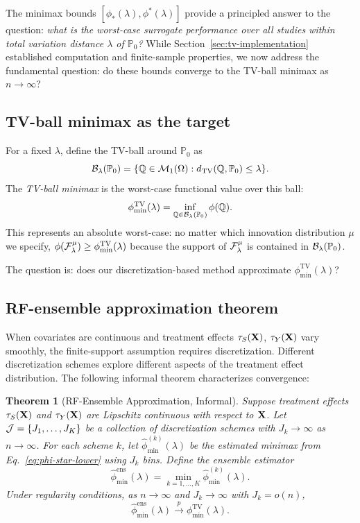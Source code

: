 \documentclass{article}
\newtheorem{theorem}{Theorem}
\newcommand{\PP}{\mathbb{P}}
\begin{document}
The minimax bounds $[\phi_*(\lambda), \phi^*(\lambda)]$ provide a principled answer to the question: \emph{what is the worst-case surrogate performance over all studies within total variation distance $\lambda$ of $\PP_0$?} While Section~\ref{sec:tv-implementation} established computation and finite-sample properties, we now address the fundamental question: do these bounds converge to the TV-ball minimax as $n \to \infty$?

\subsection{TV-ball minimax as the target}

For a fixed $\lambda$, define the TV-ball around $\PP_0$ as
\[
    \cB_\lambda(\PP_0) = \{\Q \in \cM_1(\Omega) : d_{\mathrm{TV}}(\Q, \PP_0) \leq \lambda\}.
\]
The \emph{TV-ball minimax} is the worst-case functional value over this ball:
\begin{align}\label{eq:tv-minimax}
    \phi_{\min}^{\mathrm{TV}}(\lambda) = \inf_{\Q \in \cB_\lambda(\PP_0)} \phi(\Q).
\end{align}
This represents an absolute worst-case: no matter which innovation distribution $\mu$ we specify, $\phi(\mathcal{F}_\lambda^\mu) \geq \phi_{\min}^{\mathrm{TV}}(\lambda)$ because the support of $\mathcal{F}_\lambda^\mu$ is contained in $\cB_\lambda(\PP_0)$.

The question is: does our discretization-based method approximate $\phi_{\min}^{\mathrm{TV}}(\lambda)$?

\subsection{RF-ensemble approximation theorem}

When covariates are continuous and treatment effects $\tau_S(\mathbf{X})$, $\tau_Y(\mathbf{X})$ vary smoothly, the finite-support assumption requires discretization. Different discretization schemes explore different aspects of the treatment effect distribution. The following informal theorem characterizes convergence:

\begin{theorem}[RF-Ensemble Approximation, Informal]\label{thm:rf-ensemble}
Suppose treatment effects $\tau_S(\mathbf{X})$ and $\tau_Y(\mathbf{X})$ are Lipschitz continuous with respect to $\mathbf{X}$. Let $\mathcal{J} = \{J_1, \ldots, J_K\}$ be a collection of discretization schemes with $J_k \to \infty$ as $n \to \infty$. For each scheme $k$, let $\hat{\phi}_{\min}^{(k)}(\lambda)$ be the estimated minimax from Eq.~\eqref{eq:phi-star-lower} using $J_k$ bins. Define the ensemble estimator
\[
    \hat{\phi}_{\min}^{\mathrm{ens}}(\lambda) = \min_{k=1,\ldots,K} \hat{\phi}_{\min}^{(k)}(\lambda).
\]
Under regularity conditions, as $n \to \infty$ and $J_k \to \infty$ with $J_k = o(n)$,
\[
    \hat{\phi}_{\min}^{\mathrm{ens}}(\lambda) \xrightarrow{p} \phi_{\min}^{\mathrm{TV}}(\lambda).
\]
\end{theorem}
\end{document}
